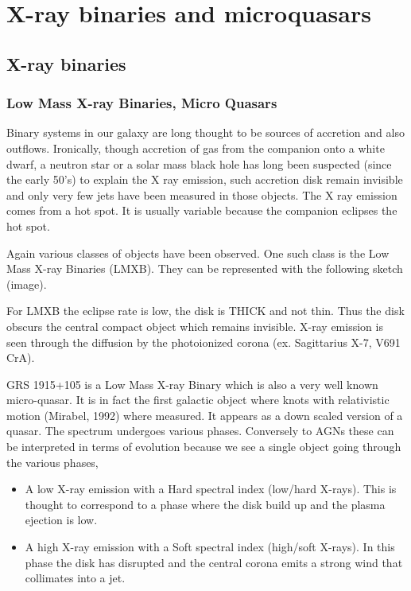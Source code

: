 \documentclass[10pt,a4paper,english]{article}
\begin{document}
\section{X-ray binaries and microquasars}
\subsection{X-ray binaries}
\subsubsection{Low Mass X-ray Binaries, Micro Quasars}
Binary systems in our galaxy are long thought to be sources of
accretion and also outflows. Ironically, though accretion of gas from
the companion onto a white dwarf, a neutron star or a solar mass black
hole has long been suspected (since the early 50's) to explain the X
ray emission, such accretion disk remain invisible and only very few
jets have been measured in those objects. The X ray emission comes
from a hot spot. It is usually variable because the companion eclipses
the hot spot.

Again various classes of objects have been observed. One such class is
the Low Mass X-ray Binaries (LMXB). They can be represented with the
following sketch (image).

For LMXB the eclipse rate is low, the disk is THICK and not thin. Thus
the disk obscurs the central compact object which remains
invisible. X-ray emission is seen through the diffusion by the
photoionized corona (ex. Sagittarius X-7, V691 CrA).

GRS 1915+105 is a Low Mass X-ray Binary which is also a very well
known micro-quasar. It is in fact the first galactic object where
knots with relativistic motion (Mirabel, 1992) where measured. It
appears as a down scaled version of a quasar. The spectrum undergoes
various phases. Conversely to AGNs these can be interpreted in terms
of evolution because we see a single object going through the various
phases,

\begin{itemize}
\item A low X-ray emission with a Hard spectral index (low/hard
  X-rays). This is thought to correspond to a phase where the disk
  build up and the plasma ejection is low.
\item A high X-ray emission with a Soft spectral index (high/soft
  X-rays). In this phase the disk has disrupted and the central corona
  emits a strong wind that collimates into a jet.
\end{itemize}
\end{document}
